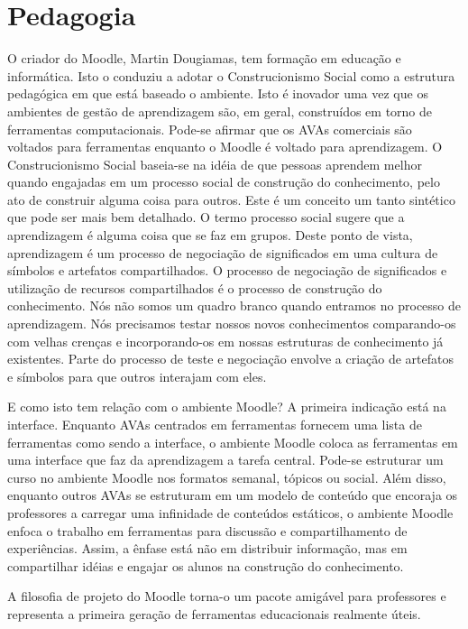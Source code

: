 \section{Pedagogia}

O criador do Moodle, Martin Dougiamas, tem formação em educação e informática. Isto o conduziu a adotar o Construcionismo Social como a estrutura pedagógica em que está baseado o ambiente. Isto é inovador uma vez que os ambientes de gestão de aprendizagem são, em geral, construídos em torno de ferramentas computacionais. Pode-se afirmar que os AVAs comerciais são voltados para ferramentas enquanto o Moodle é voltado para aprendizagem. O Construcionismo Social baseia-se na idéia de que pessoas aprendem melhor quando engajadas em um processo social de construção do conhecimento, pelo ato de construir alguma coisa para outros. Este é um conceito um tanto sintético que pode ser mais bem detalhado. O termo processo social sugere que a aprendizagem é alguma coisa que se faz em grupos. Deste ponto de vista, aprendizagem é um processo de negociação de significados em uma cultura de símbolos e artefatos compartilhados. O processo de negociação de significados e utilização de recursos compartilhados é o processo de construção do conhecimento. Nós não somos um quadro branco quando entramos no processo de aprendizagem. Nós precisamos testar nossos novos conhecimentos comparando-os com velhas crenças e incorporando-os em nossas estruturas de conhecimento já existentes. Parte do processo de teste e negociação envolve a criação de artefatos e símbolos para que outros interajam com eles.

E como isto tem relação com o ambiente Moodle? A primeira indicação está na interface. Enquanto AVAs centrados em ferramentas fornecem uma lista de ferramentas como sendo a interface, o ambiente Moodle coloca as ferramentas em uma interface que faz da aprendizagem a tarefa central. Pode-se estruturar um curso no ambiente Moodle nos formatos semanal, tópicos ou social. Além disso, enquanto outros AVAs se estruturam em um modelo de conteúdo que encoraja os professores a carregar uma infinidade de conteúdos estáticos, o ambiente Moodle enfoca o trabalho em ferramentas para discussão e compartilhamento de experiências. Assim, a ênfase está não em distribuir informação, mas em compartilhar idéias e engajar os alunos na construção do conhecimento.

A filosofia de projeto do Moodle torna-o um pacote amigável para professores e representa a primeira geração de ferramentas educacionais realmente úteis.

